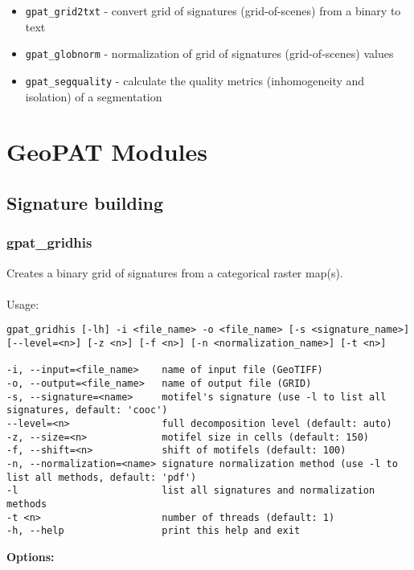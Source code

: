 \begin{itemize}
  \item \texttt{gpat\_grid2txt} - convert grid of signatures (grid-of-scenes) from a binary to text
  \item \texttt{gpat\_globnorm} - normalization of grid of signatures (grid-of-scenes) values
  \item \texttt{gpat\_segquality} - calculate the quality metrics (inhomogeneity and isolation) of a segmentation
\end{itemize}

\section{GeoPAT Modules}

\subsection{Signature building}

\subsubsection{gpat\_gridhis}
Creates a binary grid of signatures from a categorical raster map(s).
\\\\
Usage:

\begin{minipage}{\linewidth}
\begin{lstlisting}
gpat_gridhis [-lh] -i <file_name> -o <file_name> [-s <signature_name>] [--level=<n>] [-z <n>] [-f <n>] [-n <normalization_name>] [-t <n>]

-i, --input=<file_name>    name of input file (GeoTIFF)
-o, --output=<file_name>   name of output file (GRID)
-s, --signature=<name>     motifel's signature (use -l to list all signatures, default: 'cooc')
--level=<n>                full decomposition level (default: auto)
-z, --size=<n>             motifel size in cells (default: 150)
-f, --shift=<n>            shift of motifels (default: 100)
-n, --normalization=<name> signature normalization method (use -l to list all methods, default: 'pdf')
-l                         list all signatures and normalization methods
-t <n>                     number of threads (default: 1)
-h, --help                 print this help and exit
\end{lstlisting}
\end{minipage}

{\bf Options:}

